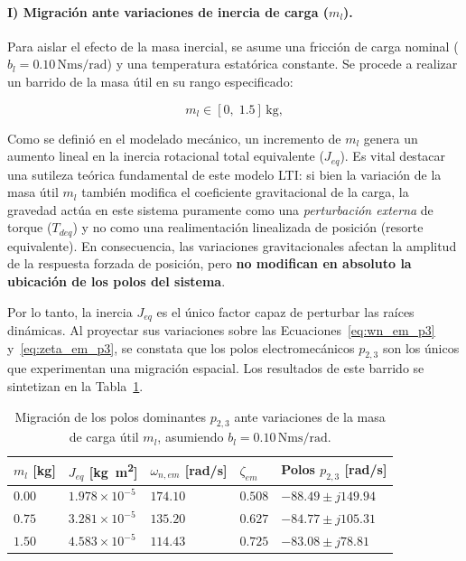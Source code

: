 \documentclass[10pt,a4paper]{article}
\begin{document}
\paragraph{I) Migración ante variaciones de inercia de carga ($m_l$).}

Para aislar el efecto de la masa inercial, se asume una fricción de carga nominal ($b_l = 0.10\,\si{\newton\meter\second\per\radian}$) y una temperatura estatórica constante. 
Se procede a realizar un barrido de la masa útil en su rango especificado:

\begin{equation*}
    m_l \in [0,\;1.5]\,\si{\kilogram},
\end{equation*}

Como se definió en el modelado mecánico, un incremento de $m_l$ genera un aumento lineal en la inercia rotacional total equivalente ($J_{eq}$). Es vital destacar una sutileza teórica fundamental de este modelo LTI: si bien la variación de la masa útil $m_l$ también modifica el coeficiente gravitacional de la carga, la gravedad actúa en este sistema puramente como una \textit{perturbación externa} de torque ($T_{deq}$) y no como una realimentación linealizada de posición (resorte equivalente). En consecuencia, las variaciones gravitacionales afectan la amplitud de la respuesta forzada de posición, pero \textbf{no modifican en absoluto la ubicación de los polos del sistema}. 

Por lo tanto, la inercia $J_{eq}$ es el único factor capaz de perturbar las raíces dinámicas. Al proyectar sus variaciones sobre las Ecuaciones~\eqref{eq:wn_em_p3} y~\eqref{eq:zeta_em_p3}, se constata que los polos electromecánicos $p_{2,3}$ son los únicos que experimentan una migración espacial. Los resultados de este barrido se sintetizan en la Tabla~\ref{tab:migracion_ml}.

\begin{table}[H]
    \centering
    \caption{Migración de los polos dominantes $p_{2,3}$ ante variaciones de la masa de carga útil $m_l$, asumiendo $b_l=0.10\,\si{\newton\meter\second\per\radian}$.}
    \label{tab:migracion_ml}
    \begin{tabular}{>{\raggedright\arraybackslash}p{2cm} >{\centering\arraybackslash}p{2.5cm} >{\centering\arraybackslash}p{2cm} >{\centering\arraybackslash}p{1.5cm} >{\centering\arraybackslash}p{4cm}}
        \toprule
        \textbf{$m_l$ [kg]} & \textbf{$J_{eq}$ [\si{\kilogram\meter\squared}]} & \textbf{$\omega_{n,em}$ [rad/s]} & \textbf{$\zeta_{em}$} & \textbf{Polos $p_{2,3}$ [rad/s]} \\
        \midrule
        $0.00$ & $1.978\times10^{-5}$ & $174.10$ & $0.508$ & $-88.49 \pm j149.94$ \\
        \addlinespace
        $0.75$ & $3.281\times10^{-5}$ & $135.20$ & $0.627$ & $-84.77 \pm j105.31$ \\
        \addlinespace
        $1.50$ & $4.583\times10^{-5}$ & $114.43$ & $0.725$ & $-83.08 \pm j78.81$ \\
        \bottomrule
    \end{tabular}
\end{table}
\end{document}
